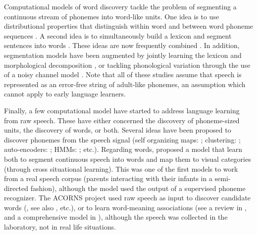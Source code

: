 \documentclass[jou,apacite]{apa6}
\begin{document}
Computational models of word discovery tackle the problem of segmenting a continuous stream of phonemes into word-like units. One idea is to use distributional properties that distinguish within word and between word phoneme sequences \cite{harris_1954,elman_1990,christiansen_2005}. A second idea is to simultaneously build a lexicon and segment sentences into words \cite{olivier_1968,de_marcken_1996,goldwater_2007}. These ideas are now frequently combined \cite{brent_1996,johnson_2008}.  In addition, segmentation models have been augmented by jointly learning the lexicon and morphological decomposition \cite{johnson_2008,botha_2013}, or tackling phonological variation through the use of a noisy channel model \cite{elsner_2012}. Note that all of these studies assume that speech is represented as an error-free string of adult-like phonemes, an assumption which cannot apply to early language learners. 

Finally, a few computational model have started to address language learning from raw speech. These have either concerned the discovery of phoneme-sized units, the discovery of words, or both. Several ideas have been proposed to discover phonemes from the speech signal (self organizing maps: ; clustering: ; auto-encoders: ; HMMs: ; etc.). Regarding words,  proposed a model that learn both to segment continuous speech into words and map them to visual categories (through cross situational learning). This was one of the first models to work from a real speech corpus (parents interacting with their infants in a semi-directed fashion), although the model used the output of a supervised phoneme recognizer.  The ACORNS project \cite{boves_2007} used raw speech as input to discover candidate words (, see also , etc.), or to learn word-meaning associations (see a review in , and a comprehensive model in ), although the speech was collected in the laboratory, not in real life situations. 
\end{document}
